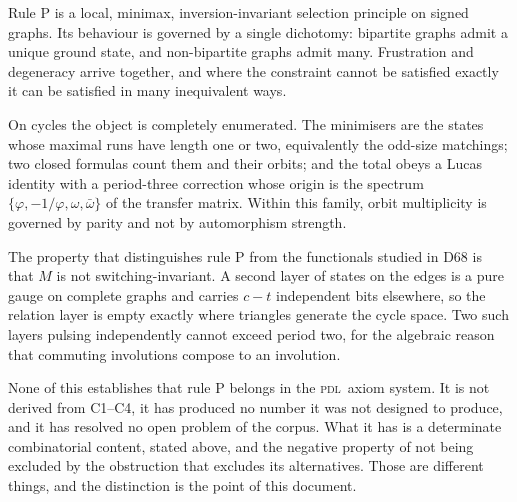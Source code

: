 \documentclass[11pt,a4paper]{article}
\newcommand{\PDL}{\textsc{pdl}}
\begin{document}
Rule P is a local, minimax, inversion-invariant selection principle on signed graphs. Its behaviour is governed by a single dichotomy: bipartite graphs admit a unique ground state, and non-bipartite graphs admit many. Frustration and degeneracy arrive together, and where the constraint cannot be satisfied exactly it can be satisfied in many inequivalent ways.

On cycles the object is completely enumerated. The minimisers are the states whose maximal runs have length one or two, equivalently the odd-size matchings; two closed formulas count them and their orbits; and the total obeys a Lucas identity with a period-three correction whose origin is the spectrum $\{\varphi,-1/\varphi,\omega,\bar\omega\}$ of the transfer matrix. Within this family, orbit multiplicity is governed by parity and not by automorphism strength.

The property that distinguishes rule P from the functionals studied in D68 is that $M$ is not switching-invariant. A second layer of states on the edges is a pure gauge on complete graphs and carries $c-t$ independent bits elsewhere, so the relation layer is empty exactly where triangles generate the cycle space. Two such layers pulsing independently cannot exceed period two, for the algebraic reason that commuting involutions compose to an involution.

None of this establishes that rule P belongs in the \PDL\ axiom system. It is not derived from C1--C4, it has produced no number it was not designed to produce, and it has resolved no open problem of the corpus. What it has is a determinate combinatorial content, stated above, and the negative property of not being excluded by the obstruction that excludes its alternatives. Those are different things, and the distinction is the point of this document.

\clearpage


\end{document}
